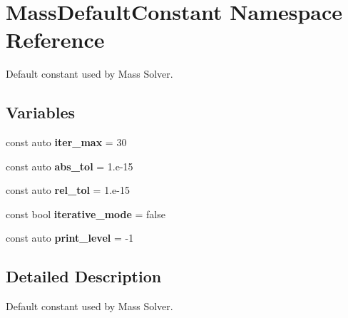 \hypertarget{namespaceMassDefaultConstant}{}\section{Mass\+Default\+Constant Namespace Reference}
\label{namespaceMassDefaultConstant}


Default constant used by Mass Solver.  


\subsection*{Variables}
\begin{DoxyCompactItemize}
\item 
\mbox{\label{namespaceMassDefaultConstant_a949a7fc9588a4ae96238e9d2f9688af0}} 
const auto {\bfseries iter\+\_\+max} = 30
\item 
\mbox{\label{namespaceMassDefaultConstant_a76dbd9d656a7740923eda6fb3916b5e9}} 
const auto {\bfseries abs\+\_\+tol} = 1.e-\/15
\item 
\mbox{\label{namespaceMassDefaultConstant_ab44f8156079c452cb0b9727e53fbac0d}} 
const auto {\bfseries rel\+\_\+tol} = 1.e-\/15
\item 
\mbox{\label{namespaceMassDefaultConstant_aa2260f61fe97f6f983749bde12f28dff}} 
const bool {\bfseries iterative\+\_\+mode} = false
\item 
\mbox{\label{namespaceMassDefaultConstant_ab20560d24f75f9764fcb7a1bdd077063}} 
const auto {\bfseries print\+\_\+level} = -\/1
\end{DoxyCompactItemize}


\subsection{Detailed Description}
Default constant used by Mass Solver. 